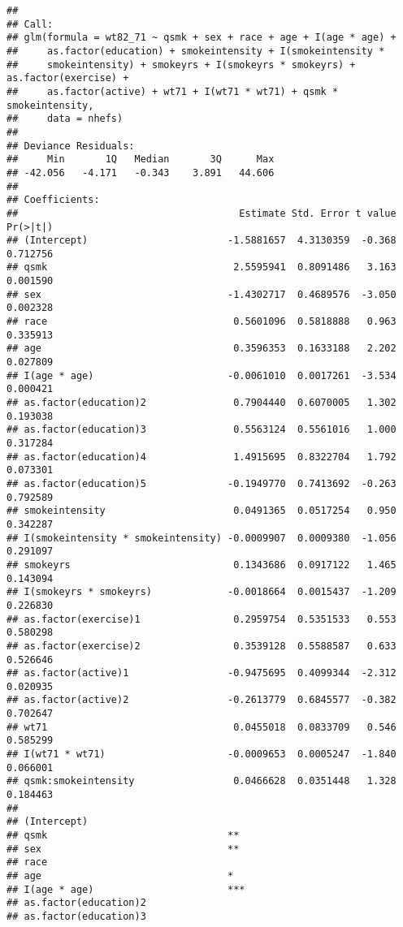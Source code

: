 \documentclass[10pt,]{book}
\begin{document}
\begin{verbatim}
## 
## Call:
## glm(formula = wt82_71 ~ qsmk + sex + race + age + I(age * age) + 
##     as.factor(education) + smokeintensity + I(smokeintensity * 
##     smokeintensity) + smokeyrs + I(smokeyrs * smokeyrs) + as.factor(exercise) + 
##     as.factor(active) + wt71 + I(wt71 * wt71) + qsmk * smokeintensity, 
##     data = nhefs)
## 
## Deviance Residuals: 
##     Min       1Q   Median       3Q      Max  
## -42.056   -4.171   -0.343    3.891   44.606  
## 
## Coefficients:
##                                      Estimate Std. Error t value Pr(>|t|)
## (Intercept)                        -1.5881657  4.3130359  -0.368 0.712756
## qsmk                                2.5595941  0.8091486   3.163 0.001590
## sex                                -1.4302717  0.4689576  -3.050 0.002328
## race                                0.5601096  0.5818888   0.963 0.335913
## age                                 0.3596353  0.1633188   2.202 0.027809
## I(age * age)                       -0.0061010  0.0017261  -3.534 0.000421
## as.factor(education)2               0.7904440  0.6070005   1.302 0.193038
## as.factor(education)3               0.5563124  0.5561016   1.000 0.317284
## as.factor(education)4               1.4915695  0.8322704   1.792 0.073301
## as.factor(education)5              -0.1949770  0.7413692  -0.263 0.792589
## smokeintensity                      0.0491365  0.0517254   0.950 0.342287
## I(smokeintensity * smokeintensity) -0.0009907  0.0009380  -1.056 0.291097
## smokeyrs                            0.1343686  0.0917122   1.465 0.143094
## I(smokeyrs * smokeyrs)             -0.0018664  0.0015437  -1.209 0.226830
## as.factor(exercise)1                0.2959754  0.5351533   0.553 0.580298
## as.factor(exercise)2                0.3539128  0.5588587   0.633 0.526646
## as.factor(active)1                 -0.9475695  0.4099344  -2.312 0.020935
## as.factor(active)2                 -0.2613779  0.6845577  -0.382 0.702647
## wt71                                0.0455018  0.0833709   0.546 0.585299
## I(wt71 * wt71)                     -0.0009653  0.0005247  -1.840 0.066001
## qsmk:smokeintensity                 0.0466628  0.0351448   1.328 0.184463
##                                       
## (Intercept)                           
## qsmk                               ** 
## sex                                ** 
## race                                  
## age                                *  
## I(age * age)                       ***
## as.factor(education)2                 
## as.factor(education)3                 

\end{verbatim}
\end{document}
